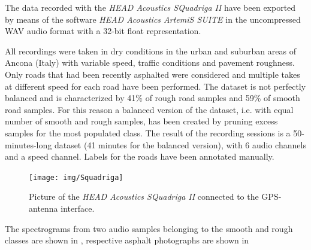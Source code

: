 The data recorded with the \textit{HEAD Acoustics SQuadriga II} have been exported by means of the software \textit{HEAD Acoustics ArtemiS SUITE} in the uncompressed WAV audio format with a 32-bit float representation.

All recordings were taken in dry conditions in the urban and suburban areas of Ancona (Italy) with variable speed, traffic conditions and pavement roughness. Only roads that had been recently asphalted were considered and multiple takes at different speed for each road have been performed. The dataset is not perfectly balanced and is characterized by 41\% of rough road samples and 59\% of smooth road samples. For this reason a balanced version of the dataset, i.e. with equal number of smooth and rough samples, has been created by pruning excess samples for the most populated class. 
The result of the recording sessions is a 50-minutes-long dataset (41 minutes for the balanced version), with 6 audio channels and a speed channel. Labels for the roads have been annotated manually.

\begin{figure}[h]
	\centering
	\texttt{[image: img/Squadriga]}
	\caption[HEAD Acoustics SQuadriga II]{Picture of the \textit{HEAD Acoustics SQuadriga II} connected to the GPS-antenna interface.}
	\label{fig:car-Squadriga}
\end{figure}

The spectrograms from two audio samples belonging to the smooth and rough classes are shown in , respective asphalt photographs are shown in 

